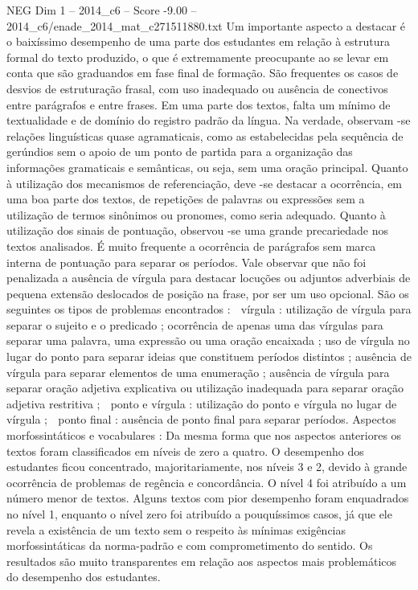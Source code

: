 \begin{textsample}{NEG Dim 1 – 2014\_c6 – Score -9.00 – 2014\_c6/enade\_2014\_mat\_c271511880.txt}
Um importante aspecto a destacar é o baixíssimo desempenho de uma parte dos estudantes em relação à estrutura formal do texto produzido, o que é extremamente preocupante ao se levar em conta que são graduandos em fase final de formação.
São frequentes os casos de desvios de estruturação frasal, com uso inadequado ou ausência de conectivos entre parágrafos e entre frases.
Em uma parte dos textos, falta um mínimo de textualidade e de domínio do registro padrão da língua.
Na verdade, observam -se relações linguísticas quase agramaticais, como as estabelecidas pela sequência de gerúndios sem o apoio de um ponto de partida para a organização das informações gramaticais e semânticas, ou seja, sem uma oração principal.
Quanto à utilização dos mecanismos de referenciação, deve -se destacar a ocorrência, em uma boa parte dos textos, de repetições de palavras ou expressões sem a utilização de termos sinônimos ou pronomes, como seria adequado.
Quanto à utilização dos sinais de pontuação, observou -se uma grande precariedade nos textos analisados.
É muito frequente a ocorrência de parágrafos sem marca interna de pontuação para separar os períodos.
Vale observar que não foi penalizada a ausência de vírgula para destacar locuções ou adjuntos adverbiais de pequena extensão deslocados de posição na frase, por ser um uso opcional.
São os seguintes os tipos de problemas encontrados :  vírgula : utilização de vírgula para separar o sujeito e o predicado ; ocorrência de apenas uma das vírgulas para separar uma palavra, uma expressão ou uma oração encaixada ; uso de vírgula no lugar do ponto para separar ideias que constituem períodos distintos ; ausência de vírgula para separar elementos de uma enumeração ; ausência de vírgula para separar oração adjetiva explicativa ou utilização inadequada para separar oração adjetiva restritiva ;  ponto e vírgula : utilização do ponto e vírgula no lugar de vírgula ;  ponto final : ausência de ponto final para separar períodos.
Aspectos morfossintáticos e vocabulares : Da mesma forma que nos aspectos anteriores os textos foram classificados em níveis de zero a quatro.
O desempenho dos estudantes ficou concentrado, majoritariamente, nos níveis 3 e 2, devido à grande ocorrência de problemas de regência e concordância.
O nível 4 foi atribuído a um número menor de textos.
Alguns textos com pior desempenho foram enquadrados no nível 1, enquanto o nível zero foi atribuído a pouquíssimos casos, já que ele revela a existência de um texto sem o respeito às mínimas exigências morfossintáticas da norma-padrão e com comprometimento do sentido.
Os resultados são muito transparentes em relação aos aspectos mais problemáticos do desempenho dos estudantes.

\end{textsample}
